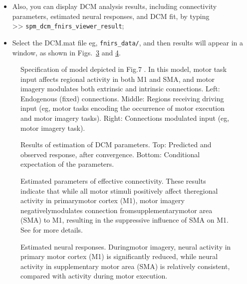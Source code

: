 \begin{enumerate}
\begin{itemize}
\item Also, you can display DCM analysis results, including connectivity parameters, estimated neural responses, and DCM fit, by typing \\ 
>> \texttt{spm\_dcm\_fnirs\_viewer\_result};
\item Select the DCM.mat file eg, \texttt{fnirs\_data/}, and then results will appear in a window, as shown in Figs.~\ref{fig:est_conn} and \ref{fig:est_neural}. 
\end{itemize}
\end{enumerate}

\newpage
\begin{figure}
\begin{center}
\caption{Specification of model depicted in Fig.7 \cite{tak2015dynamic}. In this model, motor task input affects regional activity in both M1 and SMA, and motor imagery modulates both extrinsic and intrinsic connections. Left: Endogenous (fixed) connections. Middle: Regions receiving driving input (eg, motor tasks encoding the occurrence of motor execution and motor imagery tasks). Right: Connections modulated input (eg, motor imagery task).\label{fig:gui_con}}
\end{center}
\end{figure}


\newpage
\begin{figure}
\begin{center}
\caption{Results of estimation of DCM parameters. Top: Predicted and observed response, after convergence. Bottom: Conditional expectation of the parameters.\label{fig:fit}}
\end{center}
\end{figure}


\newpage
\begin{figure}
\begin{center}
\caption{Estimated parameters of effective connectivity. These results indicate that while all motor stimuli positively affect theregional activity in primarymotor cortex (M1), motor imagery negativelymodulates connection fromsupplementarymotor area (SMA) to M1, resulting in the suppressive influence of SMA on M1. See \cite{tak2015dynamic} for more details. \label{fig:est_conn}}
\end{center}
\end{figure}

\newpage
\begin{figure}
\begin{center}
\caption{Estimated neural responses. Duringmotor imagery, neural activity in primary motor cortex (M1) is significantly reduced, while neural activity in supplementary motor area (SMA) is relatively consistent, compared with activity during motor execution.\label{fig:est_neural}}
\end{center}
\end{figure}



